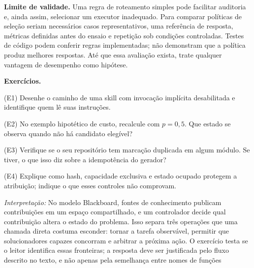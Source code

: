 \begin{aviso}
\textbf{Limite de validade.} Uma regra de roteamento simples pode facilitar
auditoria e, ainda assim, selecionar um executor inadequado. Para comparar
políticas de seleção seriam necessários casos representativos, uma referência
de resposta, métricas definidas antes do ensaio e repetição sob condições
controladas. Testes de código podem conferir regras implementadas; não demonstram
que a política produz melhores respostas. Até que essa avaliação exista, trate
qualquer vantagem de desempenho como hipótese.
\end{aviso}

\begin{aviso}
\textbf{Exercícios.}\par
(E1) Desenhe o caminho de uma skill com invocação implícita desabilitada e identifique quem lê suas instruções.\par
(E2) No exemplo hipotético de custo, recalcule com $p=0{,}5$. Que estado se observa quando não há candidato elegível?\par
(E3) Verifique se o seu repositório tem marcação duplicada  em algum módulo. Se tiver, o que isso diz sobre a idempotência do gerador?\par
(E4) Explique como hash, capacidade exclusiva e estado ocupado protegem a atribuição; indique o que esses controles não comprovam.
\end{aviso}

\noindent\textit{Interpretação:} No modelo Blackboard, fontes de conhecimento publicam contribuições em um espaço compartilhado, e um controlador decide qual contribuição altera o estado do problema. Isso separa três operações que uma chamada direta costuma esconder: tornar a tarefa observável, permitir que solucionadores capazes concorram e arbitrar a próxima ação. O exercício testa se o leitor identifica essas fronteiras; a resposta deve ser justificada pelo fluxo descrito no texto, e não apenas pela semelhança entre nomes de funções 


